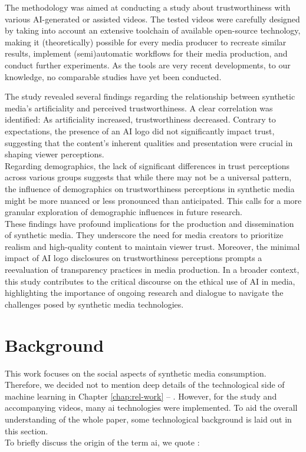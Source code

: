 \documentclass[
  a4paper,  %
  twoside,  %
  bibliography=totoc,
  headsepline,
  cleardoublepage=empty,
  parskip=half,
  draft=false
]{scrbook}
\begin{document}
The methodology was aimed at conducting a study about trustworthiness with various AI-generated or assisted videos.
The tested videos were carefully designed by taking into account an extensive toolchain of available open-source technology, making it (theoretically) possible for every media producer to recreate similar results, implement (semi)automatic workflows for their media production, and conduct further experiments. As the tools are very recent developments, to our knowledge, no comparable studies have yet been conducted.

The study revealed several findings regarding the relationship between synthetic media's artificiality and perceived trustworthiness. A clear correlation was identified: As artificiality increased, trustworthiness decreased. Contrary to expectations, the presence of an AI logo did not significantly impact trust, suggesting that the content's inherent qualities and presentation were crucial in shaping viewer perceptions. \\   
Regarding demographics, the lack of significant differences in trust perceptions across various groups suggests that while there may not be a universal pattern, the influence of demographics on trustworthiness perceptions in synthetic media might be more nuanced or less pronounced than anticipated. This calls for a more granular exploration of demographic influences in future research. \\
These findings have profound implications for the production and dissemination of synthetic media. They underscore the need for media creators to prioritize realism and high-quality content to maintain viewer trust. Moreover, the minimal impact of AI logo disclosures on trustworthiness perceptions prompts a reevaluation of transparency practices in media production. In a broader context, this study contributes to the critical discourse on the ethical use of AI in media, highlighting the importance of ongoing research and dialogue to navigate the challenges posed by synthetic media technologies.

\chapter{Background}
\label{chap:background}
This work focuses on the social aspects of synthetic media consumption. Therefore, we decided not to mention deep details of the technological side of machine learning in Chapter \ref{chap:rel-work} – . However, for the study and accompanying videos, many \gls{ai} technologies were implemented. To aid the overall understanding of the whole paper, some technological background is laid out in this section. \\
To briefly discuss the origin of the term \gls{ai}, we quote \citeauthor{haenleinBriefHistoryArtificial2019}:
\end{document}
